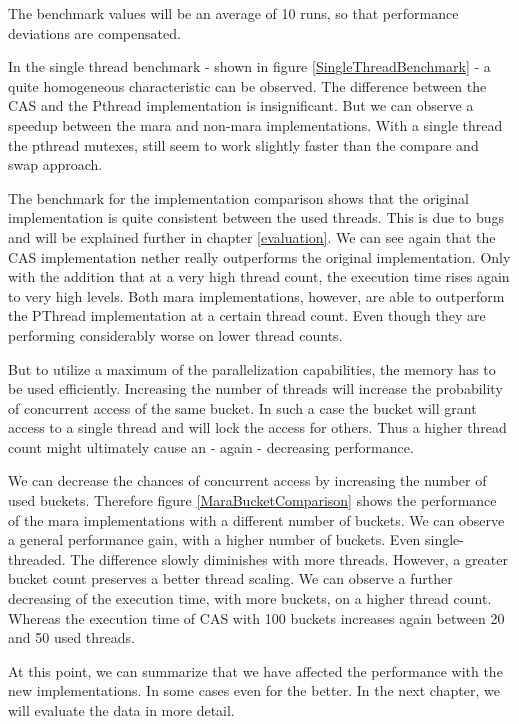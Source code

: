 The benchmark values will be an average of 10 runs, so that performance deviations are compensated.

In the single thread benchmark - shown in figure \ref{SingleThreadBenchmark} - a quite homogeneous characteristic can be observed. The difference between the CAS and the Pthread implementation is insignificant. But we can observe a speedup between the mara and non-mara implementations. With a single thread the pthread mutexes, still seem to work slightly faster than the compare and swap approach.


The benchmark for the implementation comparison shows that the original implementation is quite consistent between the used threads. This is due to bugs and will be explained further in chapter \ref{evaluation}. We can see again that the CAS implementation nether really outperforms the original implementation. Only with the addition that at a very high thread count, the execution time rises again to very high levels. Both mara implementations, however, are able to outperform the PThread implementation at a certain thread count. Even though they are performing considerably worse on lower thread counts.


But to utilize a maximum of the parallelization capabilities, the memory has to be used efficiently. Increasing the number of threads will increase the probability of concurrent access of the same bucket. In such a case the bucket will grant access to a single thread and will lock the access for others. Thus a higher thread count might ultimately cause an - again - decreasing performance.

We can decrease the chances of concurrent access by increasing the number of used buckets. Therefore figure \ref{MaraBucketComparison} shows the performance of the mara implementations with a different number of buckets. We can observe a general performance gain, with a higher number of buckets. Even single-threaded. The difference slowly diminishes with more threads. However, a greater bucket count preserves a better thread scaling. We can observe a further decreasing of the execution time, with more buckets, on a higher thread count. Whereas the execution time of CAS with 100 buckets increases again between 20 and 50 used threads.

At this point, we can summarize that we have affected the performance with the new implementations. In some cases even for the better. In the next chapter, we will evaluate the data in more detail.

